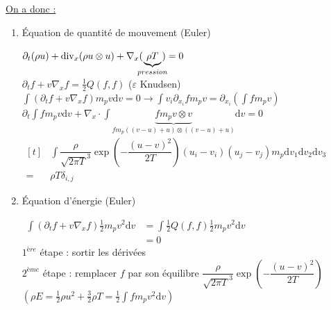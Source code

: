 \documentclass[12pt,a4paper]{article}
\begin{document}
\underline{On a donc :} 
\begin{enumerate}
	\item Équation de quantité de mouvement (Euler) \\
\hspace*{.5cm} \begin{minipage}[t]{18cm}
					$\partial_t(\rho u) + \mathrm{div}_x(\rho u \otimes u) + \nabla_x (\hspace{-.2cm}\underbrace{\rho T}_{pression}\hspace{-.2cm}) = 0$\\
				
				$\partial_t f + v \nabla_x f = \frac12 Q(f,f)$ ($\varepsilon$ Knudsen)\\
				$\displaystyle\int \left(\partial_t f + v\nabla_x f\right)m_p v \mathrm dv = 0 \to \int v_i \partial_{x_i} f m_p v  = \partial_{x_i}\left(\int fm_p v\right)$\\
				$\partial_t\displaystyle\int fm_p v\mathrm dv + \nabla_x \cdot \int \underbrace{fm_pv\otimes v}_{fm_p ((v-u)+u)\otimes((v-u)+u)}\mathrm dv = 0$\\
				$\begin{aligned}[t]
					&\displaystyle\int\dfrac\rho{\sqrt{2\pi T}^3} \exp\left(-\dfrac{(u-v)^2}{2T}\right)(u_i-v_i)(u_j-v_j)m_p \mathrm dv_1\mathrm dv_2 \mathrm dv_3\\
					=&\rho T \delta_{i,j}
				\end{aligned}$
				\end{minipage}

\item Équation d'énergie (Euler) 

\hspace*{.5cm}\begin{minipage}[t]{18cm}
	$\begin{aligned}
	\displaystyle\int \left(\partial_t f + v\nabla_x f\right)\frac12 m_p v^2 \mathrm dv&= \int \frac12Q(f,f) \frac12 m_p v^2 \mathrm dv \\
	&= 0
\end{aligned}$\\

\noindent$1^{ère}$ étape : sortir les dérivées\\
$2^{ème}$ étape : remplacer $f$ par son équilibre $\dfrac\rho{\sqrt{2\pi T}^3}\exp\left(-\dfrac{(u-v)^2}{2T}\right)$\\
$\left(\rho E = \frac12\rho u^2 + \frac32 \rho T = \frac12 \displaystyle\int fm_p v^2 \mathrm dv\right)$
\end{minipage}


\end{enumerate}
\end{document}
